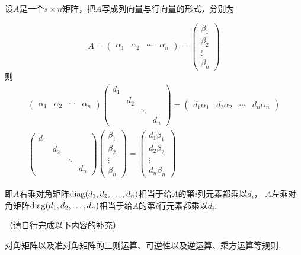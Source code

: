 \begin{theorem}
    设$A$是一个$s \times n$矩阵，把$A$写成列向量与行向量的形式，分别为

    \[ A = \begin{pmatrix}\alpha_1 & \alpha_2 & \cdots & \alpha_n\end{pmatrix} = \begin{pmatrix} \beta_1 \\ \beta_2 \\ \vdots \\ \beta_n \end{pmatrix} \]
    则
    \begin{gather*}
        \begin{pmatrix}\alpha_1 & \alpha_2 & \cdots & \alpha_n\end{pmatrix}
        \begin{pmatrix}
            d_1 & & & \\
            & d_2 & & \\
            & & \ddots & \\
            & & & d_n
        \end{pmatrix} = \begin{pmatrix}d_1\alpha_1 & d_2\alpha_2 & \cdots & d_n\alpha_n\end{pmatrix} \\
        \begin{pmatrix}
            d_1 & & & \\
            & d_2 & & \\
            & & \ddots & \\
            & & & d_n
        \end{pmatrix} \begin{pmatrix} \beta_1 \\ \beta_2 \\ \vdots \\ \beta_n \end{pmatrix} = \begin{pmatrix} d_1\beta_1 \\ d_2\beta_2 \\ \vdots \\ d_n\beta_n \end{pmatrix}
    \end{gather*}

    即$A$右乘对角矩阵$\operatorname{diag}(d_1,d_2,\ldots,d_n)$相当于给$A$的第$i$列元素都乘以$d_i$，
    $A$左乘对角矩阵$\operatorname{diag}(d_1,d_2,\ldots,d_n)$相当于给$A$的第$i$行元素都乘以$d_i$.
\end{theorem}
\begin{theorem}
    （请自行完成以下内容的补充）

    对角矩阵以及准对角矩阵的三则运算、可逆性以及逆运算、乘方运算等规则.
\end{theorem}

